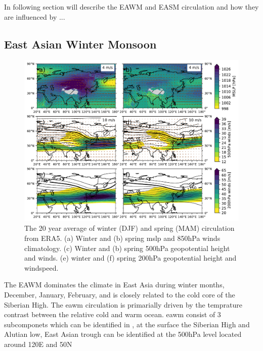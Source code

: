 In following section will describe the EAWM and EASM circulation and how they are influenced by ...   

\subsection{East Asian Winter Monsoon}
\begin{figure}[htpb]
    \centering
    \includegraphics[width=\textwidth]{texfiles/figs/climatology_1999-2019.pdf}
    \caption{The 20 year average of winter (DJF)  and spring (MAM) circulation from ERA5. (a) Winter and (b) spring \acrshort{mslp} and 850hPa winds climatology. (c) Winter and (b) spring 500hPa geopotential height and winds. (e) winter and (f) spring 200hPa geopotential height and windspeed.}
    \label{fig:clim_circulation}
\end{figure}
The EAWM dominates the climate in East Asia during winter months, December, January, February, and is closely related to the cold core of the Siberian High. The \acrshort{eawm} circulation is primarially driven by the temprature contrast between the relative cold and warm ocean. \acrshort{eawm} consist of 3 subcomponets which can be identified in , at the surface the Siberian High and Alutian low, East Asian trough can be identified at the 500hPa level located around 120\degree E and 50\degree N  

